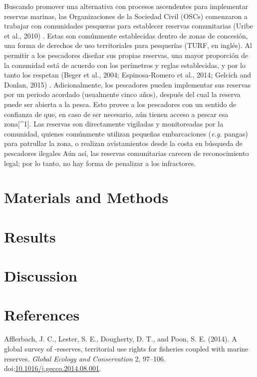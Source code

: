 \documentclass{frontiersSCNS}
\begin{document}
Buscando promover una alternativa con procesos ascendentes para
implementar reservas marinas, las Organizaciones de la Sociedad Civil
(OSCs) comenzaron a trabajar con comunidades pesqueras para establecer
reservas comunitarias (Uribe et al., 2010) . Estas son comúnmente
establecidas dentro de zonas de concesión, una forma de derechos de uso
territoriales para pesquerías (TURF, en inglés). Al permitir a los
pescadores diseñar sus propias reservas, una mayor proporción de la
comunidad está de acuerdo con los perímetros y reglas establecidas, y
por lo tanto los respetan (Beger et al., 2004; Espinosa-Romero et al.,
2014; Gelcich and Donlan, 2015) . Adicionalmente, los pescadores pueden
implementar sus reservas por un periodo acordado (usualmente cinco
años), después del cual la reserva puede ser abierta a la pesca. Esto
provee a los pescadores con un sentido de confianza de que, en caso de
ser necesario, aún tienen acceso a pescar esa zona{[}\^{}1{]}. Las
reservas son directamente vigiladas y monitoreadas por la comunidad,
quienes comúnmente utilizan pequeñas embarcaciones (\emph{e.g.} pangas)
para patrullar la zona, o realizan avistamientos desde la costa en
búsqueda de pescadores ilegales Aún así, las reservas comunitarias
carecen de reconocimiento legal; por lo tanto, no hay forma de penalizar
a los infractores.

\section{Materials and Methods}\label{materials-and-methods}

\section{Results}\label{results}

\section{Discussion}\label{discussion}

\section*{References}\label{references}

\hypertarget{refs}{}
\hypertarget{ref-afflerbach_2014-HP}{}
Afflerbach, J. C., Lester, S. E., Dougherty, D. T., and Poon, S. E.
(2014). A global survey of -reserves, territorial use rights for
fisheries coupled with marine reserves. \emph{Global Ecology and
Conservation} 2, 97--106.
doi:\href{https://doi.org/10.1016/j.gecco.2014.08.001}{10.1016/j.gecco.2014.08.001}.
\end{document}
